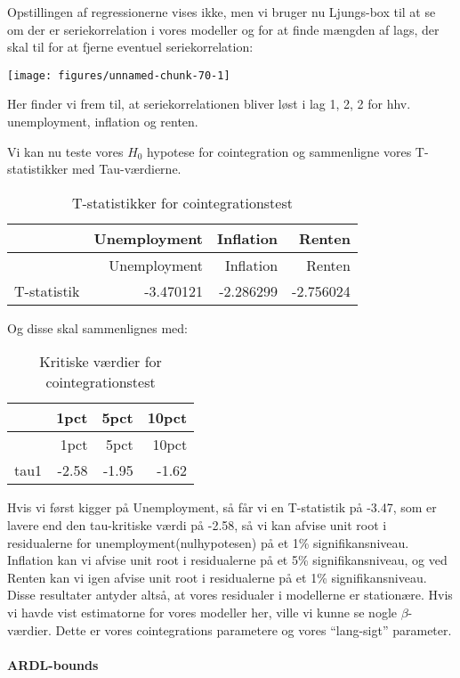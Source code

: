 \documentclass[
  10pt,
]{article}
\begin{document}
Opstillingen af regressionerne vises ikke, men vi bruger nu Ljungs-box
til at se om der er seriekorrelation i vores modeller og for at finde
mængden af lags, der skal til for at fjerne eventuel seriekorrelation:

\begin{center}\texttt{[image: figures/unnamed-chunk-70-1]} \end{center}

Her finder vi frem til, at seriekorrelationen bliver løst i lag 1, 2, 2
for hhv. unemployment, inflation og renten.\\

\newpage

Vi kan nu teste vores \(H_0\) hypotese for cointegration og sammenligne
vores T-statistikker med Tau-værdierne.

\begin{longtable}[]{@{}lrrr@{}}
\caption{T-statistikker for cointegrationstest}\tabularnewline
\toprule
& Unemployment & Inflation & Renten\tabularnewline
\midrule
\endfirsthead
\toprule
& Unemployment & Inflation & Renten\tabularnewline
\midrule
\endhead
T-statistik & -3.470121 & -2.286299 & -2.756024\tabularnewline
\bottomrule
\end{longtable}

Og disse skal sammenlignes med:

\begin{longtable}[]{@{}lrrr@{}}
\caption{Kritiske værdier for cointegrationstest}\tabularnewline
\toprule
& 1pct & 5pct & 10pct\tabularnewline
\midrule
\endfirsthead
\toprule
& 1pct & 5pct & 10pct\tabularnewline
\midrule
\endhead
tau1 & -2.58 & -1.95 & -1.62\tabularnewline
\bottomrule
\end{longtable}

Hvis vi først kigger på Unemployment, så får vi en T-statistik på -3.47,
som er lavere end den tau-kritiske værdi på -2.58, så vi kan afvise unit
root i residualerne for unemployment(nulhypotesen) på et 1\%
signifikansniveau. Inflation kan vi afvise unit root i residualerne på
et 5\% signifikansniveau, og ved Renten kan vi igen afvise unit root i
residualerne på et 1\% signifikansniveau. Disse resultater antyder
altså, at vores residualer i modellerne er stationære. Hvis vi havde
vist estimatorne for vores modeller her, ville vi kunne se nogle
\(\beta\)-værdier. Dette er vores cointegrations parametere og vores
``lang-sigt'' parameter.

\hypertarget{ardl-bounds}{%
\paragraph{ARDL-bounds}\label{ardl-bounds}}
\end{document}
